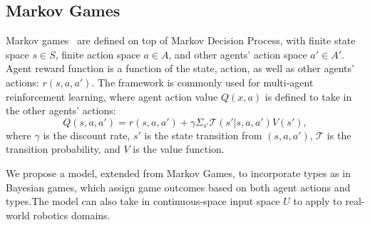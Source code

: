 \documentclass[letterpaper, 10 pt, conference]{ieeeconf}  %
\begin{document}


\vspace{-.2em}
\subsection{Markov Games}
\vspace{-.2em}
Markov games~\cite{littman1994markov} are defined on top of Markov Decision Process, with finite state space 
$s \in S$, finite action space $a \in A$, and other agents' action space 
$a' \in A'$.  Agent reward 
function is a function of the state, action, as well as other agents' actions: 
$r(s,a,a')$. The framework is commonly used for multi-agent reinforcement 
learning, where agent action value $Q(x,a)$ is defined to take in the other agents' actions:
\begin{equation}
  Q(s,a,a') = r(s,a,a') + \gamma \Sigma_{s'}\mathcal{T}(s'|s,a,a')V(s'),
\end{equation}
where $\gamma$ is the discount rate, $s'$ is the state transition from 
$(s,a,a')$, $\mathcal{T}$ is the transition probability, and $V$ is the value 
function.

We propose a model, extended from Markov Games, to incorporate types as in 
Bayesian games, which assign game outcomes based on both agent actions and 
types.The model can also take in continuous-space input space $U$ to apply to real-world robotics domains. 
\vspace{-.3em}
\end{document}

